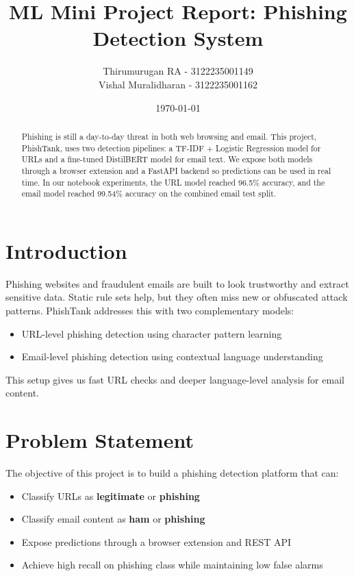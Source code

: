 \documentclass[12pt]{article}
\title{\textbf{ML Mini Project Report: Phishing Detection System}}
\author{
Thirumurugan RA - 3122235001149 \\
Vishal Muralidharan - 3122235001162 \\
}
\date{\today}
\begin{document}
\maketitle

\begin{abstract}
Phishing is still a day-to-day threat in both web browsing and email. This project, PhishTank, uses two detection pipelines: a TF-IDF + Logistic Regression model for URLs and a fine-tuned DistilBERT model for email text. We expose both models through a browser extension and a FastAPI backend so predictions can be used in real time. In our notebook experiments, the URL model reached 96.5\% accuracy, and the email model reached 99.54\% accuracy on the combined email test split.
\end{abstract}

\section{Introduction}
Phishing websites and fraudulent emails are built to look trustworthy and extract sensitive data. Static rule sets help, but they often miss new or obfuscated attack patterns. PhishTank addresses this with two complementary models:
\begin{itemize}
    \item URL-level phishing detection using character pattern learning
    \item Email-level phishing detection using contextual language understanding
\end{itemize}

This setup gives us fast URL checks and deeper language-level analysis for email content.

\section{Problem Statement}
The objective of this project is to build a phishing detection platform that can:
\begin{itemize}
    \item Classify URLs as \textbf{legitimate} or \textbf{phishing}
    \item Classify email content as \textbf{ham} or \textbf{phishing}
    \item Expose predictions through a browser extension and REST API
    \item Achieve high recall on phishing class while maintaining low false alarms
\end{itemize}
\end{document}

